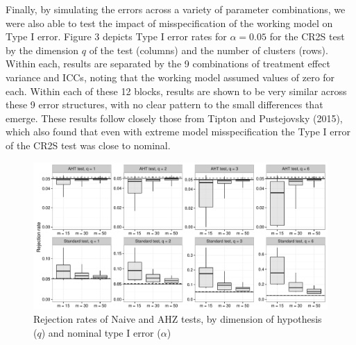 \documentclass[12pt]{article}\usepackage[]{graphicx}\usepackage[]{color}
\newenvironment{knitrout}{}{} %
\begin{document}

Finally, by simulating the errors across a variety of parameter combinations, we were also able to test the impact of misspecification of the working model on Type I error.
Figure 3 depicts Type I error rates for $\alpha = 0.05$ for the CR2S test by the dimension $q$ of the test (columns) and the number of clusters (rows).
Within each, results are separated by the 9 combinations of treatment effect variance and ICCs, noting that the working model assumed values of zero for each.
Within each of these 12 blocks, results are shown to be very similar across these 9 error structures, with no clear pattern to the small differences that emerge.
These results follow closely those from Tipton and Pustejovsky (2015), which also found that even with extreme model misspecification the Type I error of the CR2S test was close to nominal. 




\begin{knitrout}
\color{fgcolor}\begin{figure}

{\centering \includegraphics[width=\linewidth]{CR_fig/overview-1} 

}

\caption[Rejection rates of Naive and AHZ tests, by dimension of hypothesis (]{Rejection rates of Naive and AHZ tests, by dimension of hypothesis ($q$) and nominal type I error ($\alpha$)}\label{fig:overview}
\end{figure}


\end{knitrout}
\end{document}

